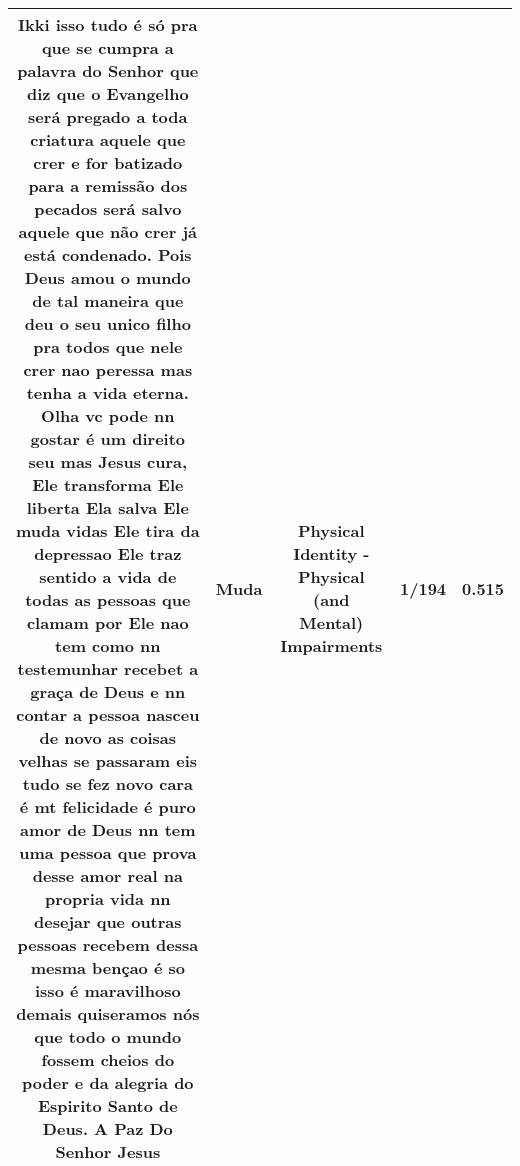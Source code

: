 \documentclass[11pt]{article}
\newlength\mylength
\begin{document}
\begin{center}
\begin{longtable}{|C{.65\mylength}|C{.30\mylength}|C{.12\mylength}|C{.12\mylength}|C{.12\mylength}|}
  \small Ikki isso tudo é só pra que se cumpra a palavra do Senhor que diz que o Evangelho será pregado a toda criatura aquele que crer e for batizado para a remissão dos pecados será salvo aquele que não crer já está condenado. Pois Deus amou o mundo de tal maneira que deu o seu unico filho pra todos que nele crer nao peressa mas tenha a vida eterna. Olha vc pode nn gostar é um direito seu mas Jesus cura, Ele transforma Ele liberta Ela salva Ele \textbf{muda} vidas Ele tira da depressao Ele traz sentido a vida de todas as pessoas que clamam por Ele nao tem como nn testemunhar recebet a graça de Deus e nn contar a pessoa nasceu de novo as coisas velhas se passaram eis tudo se fez novo cara é mt felicidade é puro amor de Deus nn tem uma pessoa que prova desse amor real na propria vida nn desejar que outras pessoas recebem dessa mesma bençao é so isso é maravilhoso demais quiseramos nós que todo o mundo fossem cheios do poder e da alegria do Espirito Santo de Deus. A Paz Do Senhor Jesus\normalsize   & Muda & Physical Identity - Physical (and Mental) Impairments & 1/194 & 0.515 \\  \hline

\end{longtable}
\end{center}
\end{document}

